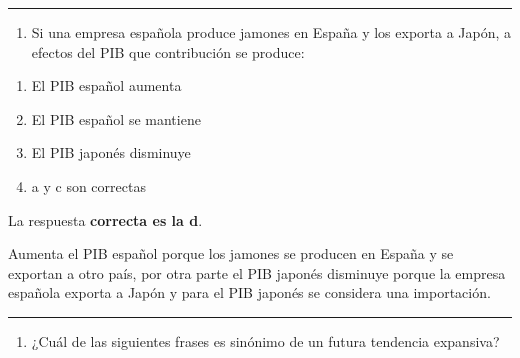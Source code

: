 \documentclass[
  letterpaper,
  DIV=11,
  numbers=noendperiod]{scrreprt}
\providecommand{\tightlist}{%
  \setlength{\itemsep}{0pt}\setlength{\parskip}{0pt}}\usepackage{longtable,booktabs,array}
\begin{document}
\begin{center}\rule{0.5\linewidth}{0.5pt}\end{center}

\begin{enumerate}
\def\labelenumi{\arabic{enumi}.}
\setcounter{enumi}{1}
\tightlist
\item
  Si una empresa española produce jamones en España y los exporta a
  Japón, a efectos del PIB que contribución se produce:
\end{enumerate}

\begin{enumerate}
\def\labelenumi{\alph{enumi})}
\item
  El PIB español aumenta
\item
  El PIB español se mantiene
\item
  El PIB japonés disminuye
\item
  a y c son correctas
\end{enumerate}

\begin{tcolorbox}[enhanced jigsaw, left=2mm, opacityback=0, colback=white, breakable, arc=.35mm, bottomrule=.15mm, rightrule=.15mm, toprule=.15mm, leftrule=.75mm, colframe=quarto-callout-tip-color-frame]
\begin{minipage}[t]{5.5mm}
\textcolor{quarto-callout-tip-color}{\faLightbulb}
\end{minipage}%
\begin{minipage}[t]{\textwidth - 5.5mm}

La respuesta \textbf{correcta es la d}.

Aumenta el PIB español porque los jamones se producen en España y se
exportan a otro país, por otra parte el PIB japonés disminuye porque la
empresa española exporta a Japón y para el PIB japonés se considera una
importación.

\end{minipage}%
\end{tcolorbox}

\begin{center}\rule{0.5\linewidth}{0.5pt}\end{center}

\begin{enumerate}
\def\labelenumi{\arabic{enumi}.}
\setcounter{enumi}{2}
\tightlist
\item
  ¿Cuál de las siguientes frases es sinónimo de un futura tendencia
  expansiva?
\end{enumerate}
\end{document}
